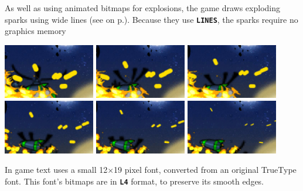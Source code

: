 \documentclass[10pt]{book}
\newcommand{\mach}[1]{\texttt{\textbf{#1}}}
\newcommand{\xref}[1]{\textit{\nameref{#1}} on  p.\pageref{#1}}
\begin{document}
\begin{CJK}{UTF8}{gkai}
As well as using animated bitmaps for explosions,
the game draws exploding sparks using wide lines (see \xref{lines}).
Because they use \mach{LINES}, the sparks require no graphics memory
\begin{center}
\includegraphics[width=0.3\textwidth]{assets/ns-lines-0006.png}
\includegraphics[width=0.3\textwidth]{assets/ns-lines-0007.png}
\includegraphics[width=0.3\textwidth]{assets/ns-lines-0008.png}
\includegraphics[width=0.3\textwidth]{assets/ns-lines-0009.png}
\includegraphics[width=0.3\textwidth]{assets/ns-lines-0010.png}
\includegraphics[width=0.3\textwidth]{assets/ns-lines-0011.png}
\end{center}

\noindent
In game text uses a small 12$\times$19 pixel font, converted from an
original TrueType font.
This font's bitmaps are in \mach{L4} format, to preserve its smooth edges.


\end{CJK}
\end{document}
